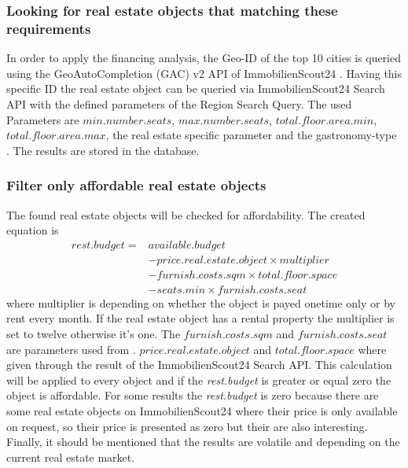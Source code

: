 \subsubsection{Looking for real estate objects that matching these requirements}
In order to apply the financing analysis, the Geo-ID of the top 10 cities is queried using the GeoAutoCompletion (GAC)
 v2 \ac{API} of ImmobilienScout24 \cite{ImmoScout}. Having this specific ID the real estate object can be queried via ImmobilienScout24 Search \ac{API}
 with the defined parameters of the Region Search Query. The used Parameters are $min.number.seats$,
 $max.number.seats$, $total.floor.area.min$, $total.floor.area.max$, the real estate specific parameter
  and the gastronomy-type . The results are stored in the \pg{} database.
\subsubsection{Filter only affordable real estate objects}
The found real estate objects will be checked for affordability. The created equation is
    \begin{equation}
        \begin{aligned}
        rest.budget = & available.budget \\
            &- price.real.estate.object \times multiplier \\
            &- furnish.costs.sqm \times total.floor.space \\
            &- seats.min \times furnish.costs.seat
        \end{aligned}
        \label{eq:affordable}
    \end{equation}
where multiplier is depending on whether the object is payed onetime only or by rent every month. If the real estate
 object has a rental property the multiplier is set to twelve otherwise it's one. The $furnish.costs.sqm$ and
 $furnish.costs.seat$ are parameters used from \cite{BenchmarkGastronomie}. $price.real.estate.object$ and
 $total.floor.space$ where given through the result of the ImmobilienScout24 Search \ac{API}.\newline
 This calculation will be applied to
 every object and if the \textit{rest.budget} is greater or equal zero the object is affordable. For some results the
 \textit{rest.budget} is zero because there are some real estate objects on ImmobilienScout24 where their
 price is only available on request, so their price is presented as zero but their are also interesting.
\newline
Finally, it should be mentioned that the results are volatile and depending on the current real estate market.
